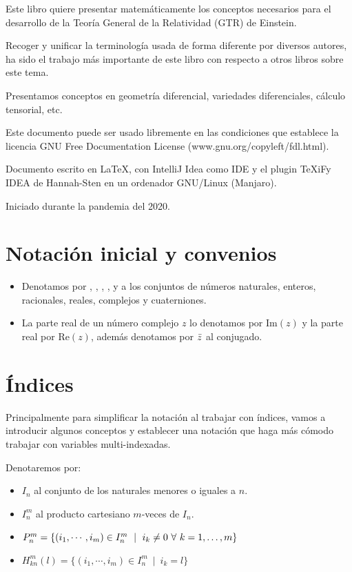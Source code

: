 Este libro quiere presentar matemáticamente los conceptos necesarios para el desarrollo de la Teoría General de la
Relatividad (GTR) de Einstein.

Recoger y unificar la terminología usada de forma diferente por diversos autores, ha sido el trabajo más importante
de este libro con respecto a otros libros sobre este tema.

Presentamos conceptos en geometría diferencial, variedades diferenciales, cálculo tensorial, etc.

Este documento puede ser usado libremente en las condiciones que establece la licencia GNU Free Documentation License
(www.gnu.org/copyleft/fdl.html).

Documento escrito en \LaTeX, con IntelliJ Idea como IDE y el plugin TeXiFy IDEA
de Hannah-Sten en un ordenador GNU/Linux (Manjaro).

Iniciado durante la pandemia del 2020.


\section{Notaci\'on inicial y convenios}\label{sec:notacion-inicial-convenios}
\begin{itemize}
  \item Denotamos por , , , ,  y  a los
  conjuntos de números naturales,
  enteros,
  racionales, reales, complejos y cuaterniones.
  \item La parte real de un número complejo $z$ lo denotamos por $\text{Im}(z)$ y la parte real por $\text{Re}(z)$,
  además
  denotamos por $\bar{z}$ al conjugado.
\end{itemize}

\section{\'Indices}\label{sec:indices}
Principalmente para simplificar la notación al trabajar con índices, vamos
a introducir algunos conceptos y establecer una notación que haga más cómodo
trabajar con variables multi-indexadas.

\begin{notation}
  Denotaremos por:
  \begin{itemize}
    \item $I_n$ al conjunto de los naturales menores o iguales a $n$.
    \item $I_n^m$ al producto cartesiano $m$-veces de $I_n$.
    \item $P_n^m=\{(i_1,\cdots,i_m)\in I_n^m\ \mid \ i_k\neq 0\ \forall\ \indexdots{k}{1}{m}\}$
    \item $H_{kn}^m(l)=\{(i_1,\cdots,i_m)\in I_n^m\ \mid \ i_k=l\}$
  \end{itemize}
\end{notation}

